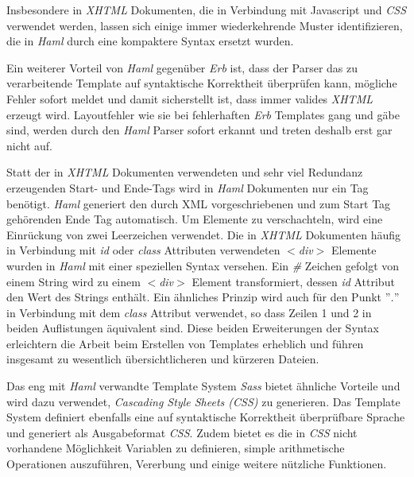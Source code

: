 

Insbesondere in \textit{XHTML} Dokumenten, die in Verbindung mit
Javascript und \textit{CSS} verwendet werden, lassen sich einige immer
wiederkehrende Muster identifizieren, die in \textit{Haml} durch eine
kompaktere Syntax ersetzt wurden.

Ein weiterer Vorteil von \textit{Haml} gegenüber \textit{Erb} ist,
dass der Parser das zu verarbeitende Template auf syntaktische
Korrektheit überprüfen kann, mögliche Fehler sofort meldet und damit
sicherstellt ist, dass immer valides \textit{XHTML} erzeugt
wird. Layoutfehler wie sie bei fehlerhaften \textit{Erb} Templates
gang und gäbe sind, werden durch den \textit{Haml} Parser sofort
erkannt und treten deshalb erst gar nicht auf.

Statt der in \textit{XHTML} Dokumenten verwendeten und sehr viel
Redundanz erzeugenden Start- und Ende-Tags wird in \textit{Haml}
Dokumenten nur ein Tag benötigt. \textit{Haml} generiert den durch XML
 vorgeschriebenen und
zum Start Tag gehörenden Ende Tag automatisch. Um Elemente zu
verschachteln, wird eine Einrückung von zwei Leerzeichen
verwendet. Die in \textit{XHTML} Dokumenten häufig in Verbindung mit
\textit{id} oder \textit{class} Attributen verwendeten
\textit{$<$div$>$} Elemente wurden in \textit{Haml} mit einer
speziellen Syntax versehen. Ein \textit{\#} Zeichen gefolgt von einem
String wird zu einem \textit{$<$div$>$} Element transformiert, dessen
\textit{id} Attribut den Wert des Strings enthält. Ein ähnliches
Prinzip wird auch für den Punkt ''\textit{.}''  in Verbindung mit dem
\textit{class} Attribut verwendet, so dass Zeilen 1 und 2 in beiden
Auflistungen äquivalent sind. Diese beiden Erweiterungen der Syntax
erleichtern die Arbeit beim Erstellen von Templates erheblich und
führen insgesamt zu wesentlich übersichtlicheren und kürzeren Dateien.

Das eng mit \textit{Haml} verwandte Template System \textit{Sass}
bietet ähnliche Vorteile und wird dazu verwendet, \textit{Cascading
  Style Sheets (CSS)} zu generieren. Das Template System definiert
ebenfalls eine auf syntaktische Korrektheit überprüfbare Sprache und
generiert als Ausgabeformat \textit{CSS}. Zudem bietet es die in
\textit{CSS} nicht vorhandene Möglichkeit Variablen zu definieren,
simple arithmetische Operationen auszuführen, Vererbung und einige
weitere nützliche Funktionen.

